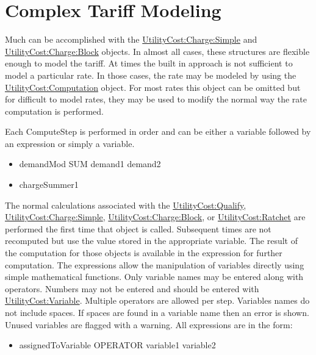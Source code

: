 \section{Complex Tariff Modeling}\label{complex-tariff-modeling}

Much can be accomplished with the \hyperref[utilitycostchargesimple]{UtilityCost:Charge:Simple} and \hyperref[utilitycostchargeblock]{UtilityCost:Charge:Block} objects. In almost all cases, these structures are flexible enough to model the tariff. At times the built in approach is not sufficient to model a particular rate. In those cases, the rate may be modeled by using the \hyperref[utilitycostcomputation]{UtilityCost:Computation} object. For most rates this object can be omitted but for difficult to model rates, they may be used to modify the normal way the rate computation is performed.

Each ComputeStep is performed in order and can be either a variable followed by an expression or simply a variable.

\begin{itemize}
\item
  demandMod SUM demand1 demand2
\item
  chargeSummer1
\end{itemize}

The normal calculations associated with the \hyperref[utilitycostqualify]{UtilityCost:Qualify}, \hyperref[utilitycostchargesimple]{UtilityCost:Charge:Simple}, \hyperref[utilitycostchargeblock]{UtilityCost:Charge:Block}, or \hyperref[utilitycostratchet]{UtilityCost:Ratchet} are performed the first time that object is called. Subsequent times are not recomputed but use the value stored in the appropriate variable. The result of the computation for those objects is available in the expression for further computation. The expressions allow the manipulation of variables directly using simple mathematical functions. Only variable names may be entered along with operators. Numbers may not be entered and should be entered with \hyperref[utilitycostvariable]{UtilityCost:Variable}. Multiple operators are allowed per step. Variables names do not include spaces. If spaces are found in a variable name then an error is shown. Unused variables are flagged with a warning. All expressions are in the form:

\begin{itemize}
\tightlist
\item
  assignedToVariable OPERATOR variable1 variable2
\end{itemize}

